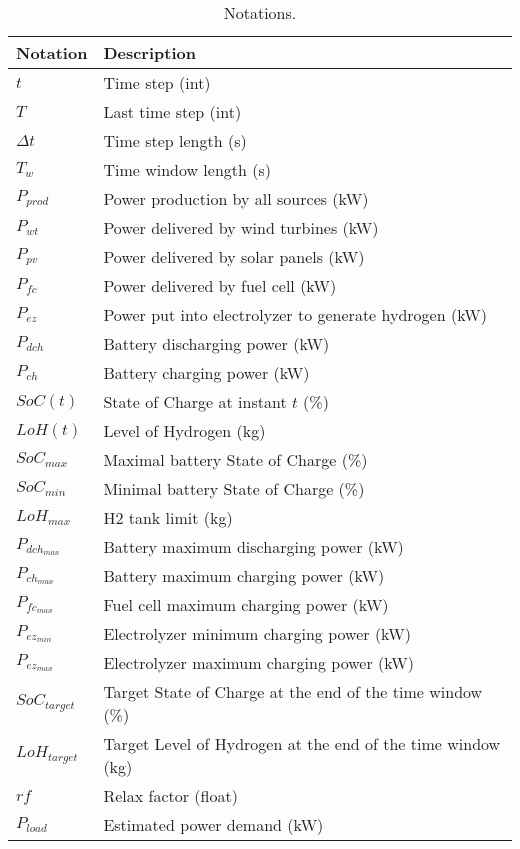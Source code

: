 \begin{table}[!htb]
\centering
\caption{Notations.}
\label{tab:notation}
\begin{tabular}{l|l}
    \hline
    Notation & Description \\\hline\hline
    $t$ & Time step (int)\\
    $T$ & Last time step (int)\\
    $\Delta t$ & Time step length (s)\\
    $T_{w}$ & Time window length (s)\\
    $P_{prod}$ & Power production by all sources (kW)\\
    $P_{wt}$ & Power delivered by wind turbines (kW)\\
    $P_{pv}$ & Power delivered by solar panels (kW)\\
    $P_{fc}$ & Power delivered by fuel cell (kW)\\
    $P_{ez}$ & Power put into electrolyzer to generate hydrogen (kW)\\
    $P_{dch}$ & Battery discharging power (kW)\\
    $P_{ch}$ & Battery charging power (kW)\\
    $SoC(t)$ & State of Charge at instant $t$ (\%)\\
    $LoH(t)$ & Level of Hydrogen (kg)\\
    $SoC_{max}$ & Maximal battery State of Charge (\%)\\
    $SoC_{min}$ & Minimal battery State of Charge (\%)\\
    $LoH_{max}$ & H2 tank limit (kg)\\
    $P_{dch_{max}}$ & Battery maximum discharging power (kW)\\
    $P_{ch_{max}}$ & Battery maximum charging power (kW)\\
    $P_{fc_{max}}$ & Fuel cell maximum charging power (kW)\\
    $P_{ez_{min}}$ & Electrolyzer minimum charging power (kW)\\
    $P_{ez_{max}}$ & Electrolyzer maximum charging power (kW)\\
    $SoC_{target}$ & Target State of Charge at the end of the time window (\%)\\
    $LoH_{target}$ & Target Level of Hydrogen at the end of the time window (kg)\\
    $rf$ & Relax factor (float) \\
    $P_{load}$ & Estimated power demand (kW)\\
    \hline
\end{tabular}
\end{table}